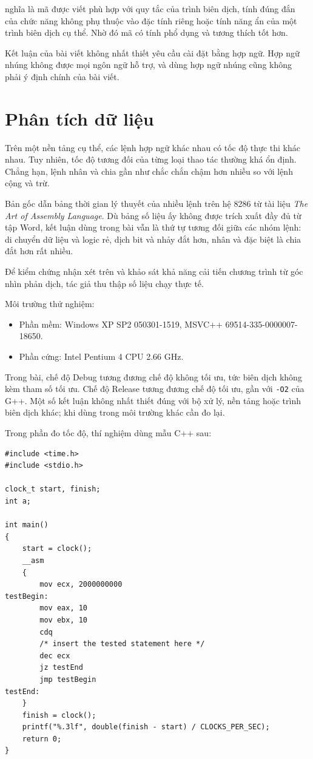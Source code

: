 \documentclass[11pt]{article}
\begin{document}
 nghĩa là mã được viết phù hợp với quy
tắc của trình biên dịch, tính đúng đắn của chức năng không phụ thuộc vào đặc
tính riêng hoặc tính năng ẩn của một trình biên dịch cụ thể. Nhờ đó mã có tính
phổ dụng và tương thích tốt hơn.

Kết luận của bài viết không nhất thiết yêu cầu cài đặt bằng hợp ngữ. Hợp ngữ
nhúng không được mọi ngôn ngữ hỗ trợ, và dùng hợp ngữ nhúng cũng không phải ý
định chính của bài viết.

\section{Phân tích dữ liệu}

Trên một nền tảng cụ thể, các lệnh hợp ngữ khác nhau có tốc độ thực thi khác
nhau. Tuy nhiên, tốc độ tương đối của từng loại thao tác thường khá ổn định.
Chẳng hạn, lệnh nhân và chia gần như chắc chắn chậm hơn nhiều so với lệnh cộng
và trừ.

Bản gốc dẫn bảng thời gian lý thuyết của nhiều lệnh trên hệ 8286 từ tài liệu
\emph{The Art of Assembly Language}. Dù bảng số liệu ấy không được trích xuất
đầy đủ từ tập Word, kết luận dùng trong bài vẫn là thứ tự tương đối giữa các
nhóm lệnh: di chuyển dữ liệu và logic rẻ, dịch bit và nhảy đắt hơn, nhân và
đặc biệt là chia đắt hơn rất nhiều.

Để kiểm chứng nhận xét trên và khảo sát khả năng cải tiến chương trình từ góc
nhìn phản dịch, tác giả thu thập số liệu chạy thực tế.

Môi trường thử nghiệm:
\begin{itemize}
  \item Phần mềm: Windows XP SP2 050301-1519, MSVC++ 69514-335-0000007-18650.
  \item Phần cứng: Intel Pentium 4 CPU 2.66 GHz.
\end{itemize}

Trong bài, chế độ Debug tương đương chế độ không tối ưu, tức biên dịch không
kèm tham số tối ưu. Chế độ Release tương đương chế độ tối ưu, gần với
\texttt{-O2} của G++. Một số kết luận không nhất thiết đúng với bộ xử lý, nền
tảng hoặc trình biên dịch khác; khi dùng trong môi trường khác cần đo lại.

Trong phần đo tốc độ, thí nghiệm dùng mẫu C++ sau:
\begin{verbatim}
#include <time.h>
#include <stdio.h>

clock_t start, finish;
int a;

int main()
{
    start = clock();
    __asm
    {
        mov ecx, 2000000000
testBegin:
        mov eax, 10
        mov ebx, 10
        cdq
        /* insert the tested statement here */
        dec ecx
        jz testEnd
        jmp testBegin
testEnd:
    }
    finish = clock();
    printf("%.3lf", double(finish - start) / CLOCKS_PER_SEC);
    return 0;
}
\end{verbatim}
\end{document}
